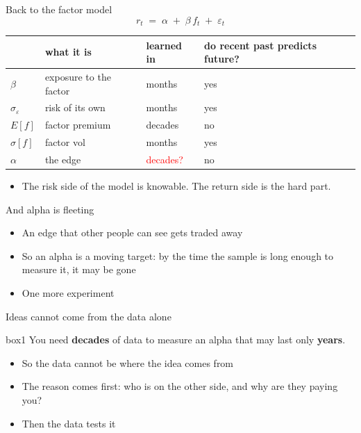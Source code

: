 \documentclass[aspectratio=169,10pt]{beamer}
\begin{document}
\begin{frame}{Back to the factor model}
\[ r_t \;=\; \alpha \;+\; \beta\, f_t \;+\; \varepsilon_t \]
\vskip 6pt
\begin{center}
\renewcommand{\arraystretch}{1.5}
\begin{tabular}{llll}
\toprule
 & what it is & learned in & do recent past predicts future?\\
\midrule
$\beta$ & exposure to the factor & months & yes\\
$\sigma_\varepsilon$ & risk of its own & months & yes\\
$E[f]$ & factor  premium &decades  & no\\
$\sigma[f]$ & factor  vol &months  & yes\\
$\alpha$ & the edge & \textcolor{red}{decades?} & no \\
\bottomrule
\end{tabular}
\end{center}
\vskip 10pt
\begin{itemize}
\item The risk side of the model is knowable. The return side is the hard part.
\end{itemize}
\end{frame}

\begin{frame}[label=fleeting]{And alpha is fleeting}
\begin{itemize}
\item An edge that other people can see gets traded away
\vskip 14pt
\item So an alpha is a moving target: by the time the sample is long enough to measure it, it may be gone
\vskip 14pt
\item One more experiment
\end{itemize}
\end{frame}

\begin{frame}{Ideas cannot come from the data alone}
\begin{beamercolorbox}[rounded=true,sep=10pt,center]{box1}
You need \textbf{decades} of data to measure an alpha that may last only \textbf{years}.
\end{beamercolorbox}
\vskip 18pt
\begin{itemize}
\item So the data cannot be where the idea comes from
\vskip 12pt
\item The reason comes first: who is on the other side, and why are they paying you?
\vskip 12pt
\item Then the data tests it
\end{itemize}
\end{frame}
\end{document}
